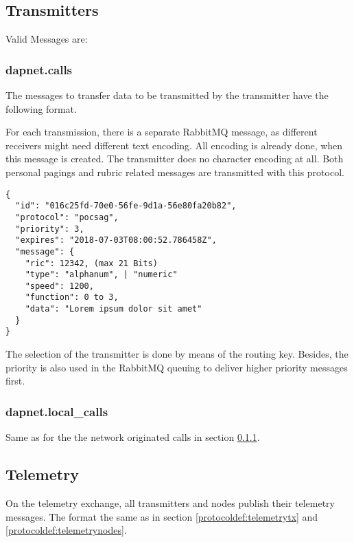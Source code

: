 \subsection{Transmitters}
\label{protocoldef:RabbitMQ:Transmitters}

Valid Messages are:

\subsubsection{dapnet.calls}
\label{protocoldef:RabbitMQ:dapnet.calls}
The messages to transfer data to be transmitted by the transmitter have the
following format.

For each transmission, there is a separate RabbitMQ message, as different
receivers might need different text encoding. All encoding is already done, when
this message is created. The transmitter does no character encoding at all. Both
personal pagings and rubric related messages are transmitted with this protocol.

\begin{lstlisting}
{
  "id": "016c25fd-70e0-56fe-9d1a-56e80fa20b82",
  "protocol": "pocsag",
  "priority": 3,
  "expires": "2018-07-03T08:00:52.786458Z",
  "message": {
    "ric": 12342, (max 21 Bits)
    "type": "alphanum", | "numeric"
    "speed": 1200,
    "function": 0 to 3,
    "data": "Lorem ipsum dolor sit amet"
  }
}
\end{lstlisting}
The selection of the transmitter is done by means of the routing key. Besides,
the priority is also used in the RabbitMQ queuing to deliver higher priority
messages first.

\subsubsection{dapnet.local\_calls}
\label{protocoldef:RabbitMQ:dapnet.local_calls}
Same as for the the network originated calls in section \ref{protocoldef:RabbitMQ:dapnet.calls}.

\subsection{Telemetry}
On the telemetry exchange, all transmitters and nodes publish their telemetry messages. The format the same as in section \ref{protocoldef:telemetrytx} and \ref{protocoldef:telemetrynodes}.

